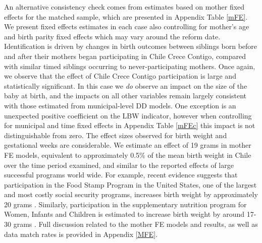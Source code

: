 \documentclass[12pt]{article}
\begin{document}
\begin{spacing}{1.4}
An alternative consistency check comes from estimates based on mother
fixed effects for the matched sample, which are presented in Appendix
Table \ref{mFE}. We present fixed effects estimates in each case also
controlling for mother's age and birth parity fixed effects which may
vary around the reform date. Identification is driven by changes in
birth outcomes between siblings born before and after their
mothers began participating in Chile Crece Contigo, compared with
similar timed siblings occurring to never-participating mothers.
Once again, we observe that the effect of Chile Crece Contigo
participation is large and statistically significant.  In this
case we \emph{do} observe an impact on the size of the baby at
birth, and the impacts on all other variables remain largely
consistent with those estimated from municipal-level DD models.
One exception is an unexpected positive coefficient on the LBW
indicator, however when controlling for municipal and time fixed
effects in Appendix Table \ref{mFEc} this impact is not
distinguishable from zero.  The effect
sizes observed for birth weight and gestational weeks are
considerable.  We estimate an effect of 19 grams in mother FE
models, equivalent to approximately 0.5\% of the mean birth
weight in Chile over the time period examined, and similar to the
reported effects of large successful programs world wide.  For
example, recent evidence suggests that participation in the Food
Stamp Program in the United States, one of the largest and most
costly social security programs, increases birth weight by
approximately 20 grams \citep{Almondetal2011}. Similarly,
participation in the supplementary nutrition program for Women,
Infants and Children is estimated to increase birth weight
by around 17-30 grams \citep{Hoynesetal2011,RossinSlater2013}.
Full discussion related to the mother FE models and results, as
well as data match rates is provided in Appendix \ref{MFE}.



\end{spacing}
\end{document}
